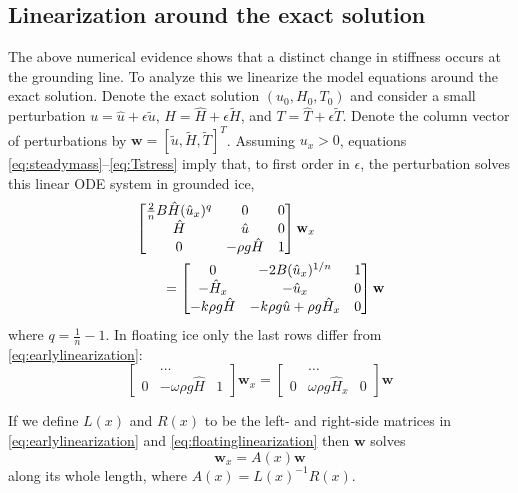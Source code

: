 \documentclass[twocolumn]{igs}
\newcommand{\bw}{\mathbf{w}}
\newcommand{\hu}{\hat u}
\newcommand{\hH}{\hat H}
\newcommand{\hT}{\hat T}
\newcommand{\tu}{\tilde u}
\newcommand{\tH}{\tilde H}
\newcommand{\tT}{\tilde T}
\newcommand{\eps}{\epsilon}
\begin{document}
\subsection*{Linearization around the exact solution}  The above numerical evidence shows that a distinct change in stiffness occurs at the grounding line.  To analyze this we linearize the model equations around the exact solution.  Denote the exact solution $(u_0,H_0,T_0)$ and consider a small perturbation $u = \hu + \eps \tu$, $H = \hH + \eps \tH$, and $T = \hT + \eps \tT$.  Denote the column vector of perturbations by $\bw = [\tu, \tH, \tT]^T$.  Assuming $u_x > 0$, equations \eqref{eq:steadymass}--\eqref{eq:Tstress} imply that, to first order in $\eps$, the perturbation solves this linear ODE system in grounded ice,
\begin{align}
&\begin{bmatrix}
\frac{2}{n} B \hH (\hu_x)^q & 0 & 0 \\
\hH & \hu & 0 \\
0 & -\rho g \hH & 1
\end{bmatrix}
\bw_x \notag \\
&\qquad =
\begin{bmatrix}
0 & - 2 B (\hu_x)^{1/n} & 1 \\
- \hH_x & - \hu_x & 0 \\
-k \rho g \hH & - k \rho g \hu + \rho g \hH_x & 0
\end{bmatrix}
\bw  \label{eq:earlylinearization}
\end{align}
where $q = \frac{1}{n} - 1$.  In floating ice only the last rows differ from \eqref{eq:earlylinearization}:
\begin{equation}
\begin{bmatrix}
 & \dots & \\
0 & - \omega \rho g \hH & 1
\end{bmatrix}
\bw_x
=
\begin{bmatrix}
 & \dots & \\
0 & \omega \rho g \hH_x & 0
\end{bmatrix}
\bw
\label{eq:floatinglinearization}
\end{equation}

If we define $L(x)$ and $R(x)$ to be the left- and right-side matrices in \eqref{eq:earlylinearization} and \eqref{eq:floatinglinearization} then $\bw$ solves
\begin{equation}
\bw_x = A(x) \bw \label{eq:linearization}
\end{equation}
along its whole length, where $A(x) = L(x)^{-1} R(x)$.
\end{document}
